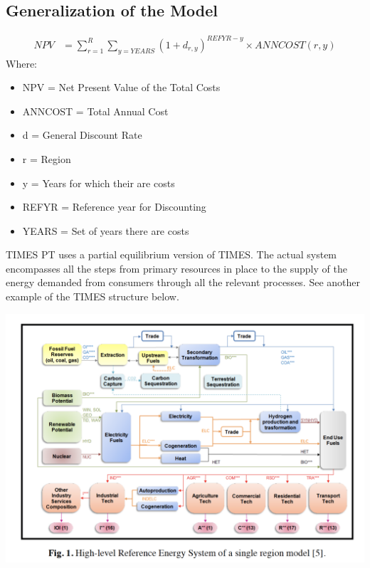 \documentclass[12pt]{article}
\begin{document}
    \subsection{Generalization of the Model}
    \begin{align}
        NPV &= \sum_{r=1}^{R} \sum_{y=YEARS} (1+d_{r,y})^{REFYR-y}\times ANNCOST(r,y)
    \end{align}
    Where:
    \begin{itemize}
        \item NPV = Net Present Value of the Total Costs
        \item ANNCOST = Total Annual Cost
        \item d = General Discount Rate
        \item r = Region
        \item y = Years for which their are costs
        \item REFYR = Reference year for Discounting
        \item YEARS = Set of years there are costs
    \end{itemize}
    TIMES PT uses a partial equilibrium version of TIMES. The actual system encompasses all the steps from primary resources in place
    to the supply of the energy demanded from consumers through all the relevant processes. See another example of the TIMES structure below.
    \begin{center}
        \includegraphics[width=\textwidth]{TIMESPT}
        \vspace{-1cm}
    \end{center}
\end{document}
